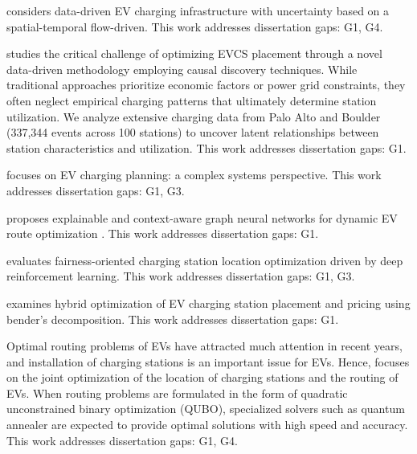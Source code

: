 \documentclass[letterpaper, 12pt, oneside, doublespacing]{Thesis}
\begin{document}
\noindent \cite{data-driven_ev_2025} considers data-driven EV charging infrastructure with uncertainty based on a spatial-temporal flow-driven. This work addresses dissertation gaps: G1, G4.



\noindent \cite{data-driven_optimization_2025} studies the critical challenge of optimizing EVCS placement through a novel data-driven methodology employing causal discovery techniques. While traditional approaches prioritize economic factors or power grid constraints, they often neglect empirical charging patterns that ultimately determine station utilization. We analyze extensive charging data from Palo Alto and Boulder (337,344 events across 100 stations) to uncover latent relationships between station characteristics and utilization. This work addresses dissertation gaps: G1.



\noindent \cite{electric_vehicle_2025} focuses on EV charging planning: a complex systems perspective. This work addresses dissertation gaps: G1, G3.



\noindent \cite{explainable_and_2025} proposes explainable and context-aware graph neural networks for dynamic EV route optimization . This work addresses dissertation gaps: G1.



\noindent \cite{planning_future_2025} evaluates fairness-oriented charging station location optimization driven by deep reinforcement learning. This work addresses dissertation gaps: G1, G3.



\noindent \cite{hybrid_optimization_2025} examines hybrid optimization of EV charging station placement and pricing using bender's decomposition. This work addresses dissertation gaps: G1.



\noindent Optimal routing problems of EVs have attracted much attention in recent years, and installation of charging stations is an important issue for EVs. Hence, \cite{joint_optimization_2025} focuses on the joint optimization of the location of charging stations and the routing of EVs. When routing problems are formulated in the form of quadratic unconstrained binary optimization (QUBO), specialized solvers such as quantum annealer are expected to provide optimal solutions with high speed and accuracy. This work addresses dissertation gaps: G1, G4.
\end{document}
